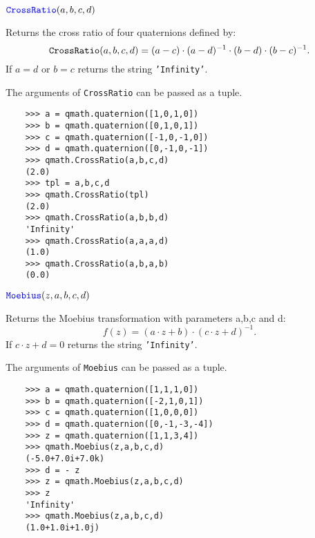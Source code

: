 \documentclass[11pt]{paper}
\begin{document}
\medskip


\noindent $\textcolor{blue}{\texttt{\mbox{CrossRatio}}}(a,b,c,d)$ 

Returns the cross ratio of four quaternions defined by:
$$
{\texttt{\mbox{CrossRatio}}}(a,b,c,d) = (a-c)\cdot(a-d)^{-1}\cdot(b-d)\cdot(b-c)^{-1}.
$$ 
If $a = d$ or $b = c$ returns the string \texttt{\mbox{'Infinity'}}.

The arguments of {\texttt{\mbox{CrossRatio}}} can be passed as a tuple.
\begin{verbatim}
    >>> a = qmath.quaternion([1,0,1,0])
    >>> b = qmath.quaternion([0,1,0,1])
    >>> c = qmath.quaternion([-1,0,-1,0])
    >>> d = qmath.quaternion([0,-1,0,-1])
    >>> qmath.CrossRatio(a,b,c,d)
    (2.0)
    >>> tpl = a,b,c,d
    >>> qmath.CrossRatio(tpl)
    (2.0)
    >>> qmath.CrossRatio(a,b,b,d)
    'Infinity'
    >>> qmath.CrossRatio(a,a,a,d)
    (1.0)
    >>> qmath.CrossRatio(a,b,a,b)
    (0.0)
\end{verbatim}
\medskip

\noindent $\textcolor{blue}{\texttt{\mbox{Moebius}}}(z,a,b,c,d)$ 

Returns the Moebius transformation with parameters a,b,c and d:
$$
f(z)=(a\cdot z+b)\cdot(c\cdot z+d)^{-1}. 
$$
If $c \cdot z + d = 0$ returns the string \texttt{\mbox{'Infinity'}}. 

The arguments of {\texttt{\mbox{Moebius}}} can be passed as a tuple.
\begin{verbatim}
    >>> a = qmath.quaternion([1,1,1,0])
    >>> b = qmath.quaternion([-2,1,0,1])
    >>> c = qmath.quaternion([1,0,0,0])
    >>> d = qmath.quaternion([0,-1,-3,-4])
    >>> z = qmath.quaternion([1,1,3,4])
    >>> qmath.Moebius(z,a,b,c,d)
    (-5.0+7.0i+7.0k)
    >>> d = - z
    >>> z = qmath.Moebius(z,a,b,c,d)
    >>> z
    'Infinity'
    >>> qmath.Moebius(z,a,b,c,d)
    (1.0+1.0i+1.0j)
\end{verbatim}

\bigskip
\end{document}
